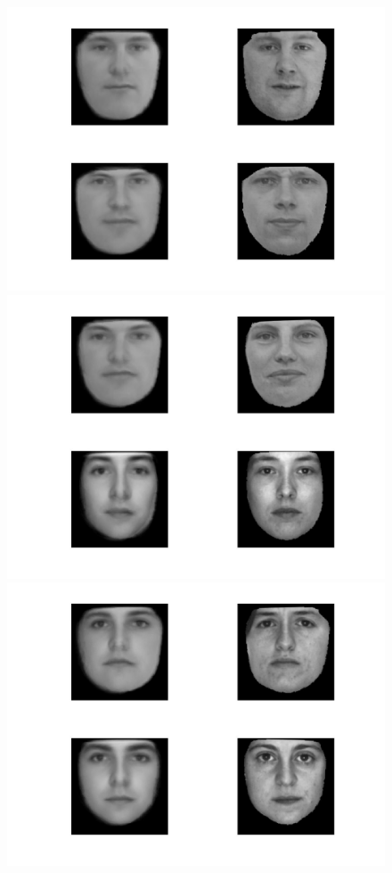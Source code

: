 \documentclass[12pt]{ctexart}
\begin{document}
\begin{enumerate}
\begin{figure}[H]
  \centering
\includegraphics[scale=0.18]{c_rec_face_wf5.jpg}
\includegraphics[scale=0.18]{c_rec_face_wf6.jpg}
\includegraphics[scale=0.18]{c_rec_face_wf7.jpg}

\end{figure}
\end{enumerate}
\end{document}
